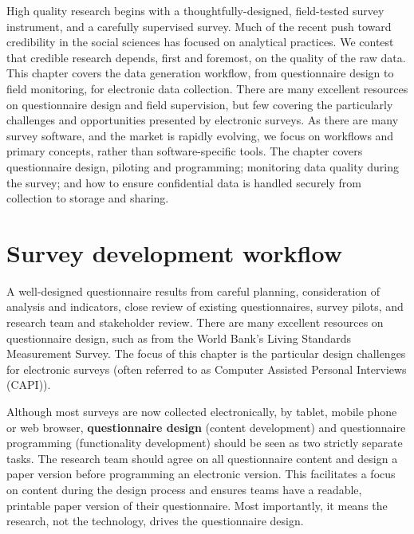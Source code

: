 
\begin{fullwidth}
High quality research begins with a thoughtfully-designed, field-tested survey instrument, and a carefully supervised survey.
Much of the recent push toward credibility in the social sciences has focused on analytical practices.
We contest that credible research depends, first and foremost, on the quality of the raw data. This chapter covers the data generation workflow, from questionnaire design to field monitoring, for electronic data collection.
There are many excellent resources on questionnaire design and field supervision,
but few covering the particularly challenges and opportunities presented by electronic surveys.
As there are many survey software, and the market is rapidly evolving, we focus on workflows and primary concepts, rather than software-specific tools.
The chapter covers questionnaire design, piloting and programming; monitoring data quality during the survey; and how to ensure confidential data is handled securely from collection to storage and sharing.


\end{fullwidth}

\section{Survey development workflow}
A well-designed questionnaire results from careful planning, consideration of analysis and indicators, close review of existing questionnaires, survey pilots, and research team and stakeholder review. There are many excellent resources on questionnaire design, such as from the World Bank's Living Standards Measurement Survey.
The focus of this chapter is the particular design challenges for electronic surveys (often referred to as Computer Assisted Personal Interviews (CAPI)).

Although most surveys are now collected electronically, by tablet, mobile phone or web browser,
\textbf{questionnaire design}
(content development) and questionnaire programming (functionality development) should be seen as two strictly separate tasks.
The research team should agree on all questionnaire content and design a paper version before programming an electronic version.
This facilitates a focus on content during the design process and ensures teams have a readable, printable paper version of their questionnaire.
Most importantly, it means the research, not the technology, drives the questionnaire design.


